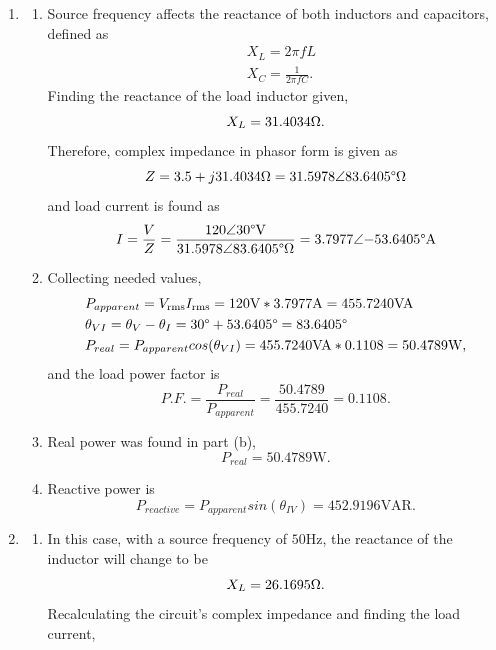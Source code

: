 \documentclass{article}
\begin{document}
\begin{enumerate}
\begin{enumerate}[label=\alph*)]
\[			\]
		  \item Reactive power \(P_{reactive}\) is given by \[
					P_{reactive} = P_{apparent}sin(\theta_{VI}) = 3.22\text{kVA} * -0.4472 = -1.44\text{kVAR}.
		  \]
			In addition, reactive power \(Q < 0\) implies a capacitive load.
			\end{enumerate}
		\item
			\begin{enumerate}[label=\alph*)]
				\item Source frequency affects the reactance of both inductors and capacitors, defined as \begin{align}
					&X_{L} = 2\pi fL \\
					&X_{C} = \frac{1}{2\pi fC}.
				\end{align}
				Finding the reactance of the load inductor given, \[
					X_{L} = 31.4034 \ohm.
				\]
				Therefore, complex impedance in phasor form is given as \[
					Z = 3.5 + j31.4034 \ohm = 31.5978\angle{83.6405\degree}\ohm
				\]
				 and load current is found as \[ 
				 I = \frac{V}{Z} = \frac{120\angle{30\degree}\text{V}}{31.5978\angle{83.6405\degree}\ohm} = 3.7977\angle{-53.6405\degree}\text{A} 
			 	 \]
			   \item Collecting needed values, \begin{align*}
					 &P_{apparent} = {V}_{\mathrm{rms}}{I}_{\mathrm{rms}} = 120\text{V}*3.7977\text{A} = 455.7240\text{VA} \\
					 &\theta_{VI} = \theta_{V} - \theta_{I} = 30\degree+53.6405\degree = 83.6405\degree \\
					 &P_{real} = P_{apparent}cos(\theta_{VI}) = 455.7240\text{VA}*0.1108 = 50.4789\text{W},
			   \end{align*}
				 and the load power factor is \[
					 P.F. = \frac{P_{real}}{P_{apparent}} = \frac{50.4789}{455.7240} = 0.1108.
				 \]
			 \item Real power was found in part (b), \[
					 P_{real} = 50.4789\text{W}.
			 \]
		   \item Reactive power is \[
					 P_{reactive} = P_{apparent}sin(\theta_{IV}) = 452.9196\text{VAR}.
		   \]
	   \end{enumerate}
		 \item
			 \begin{enumerate}[label=\alph*)]
		 	\item In this case, with a source frequency of \(50\text{Hz}\), the reactance of the inductor will change to be \[
					X_{L} = 26.1695\ohm.
		 	\]
			Recalculating the circuit's complex impedance and finding the load current, \[
\]
\end{enumerate}
\end{enumerate}
\end{document}
